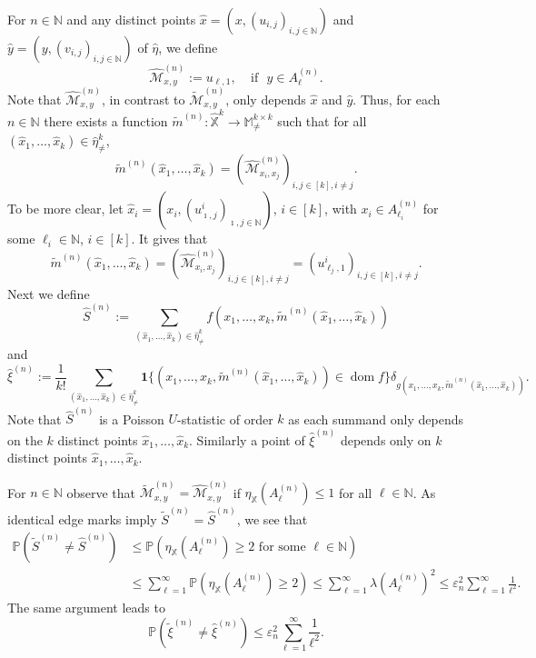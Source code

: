 \documentclass{article}
\theoremstyle{definition}
\numberwithin{equation}{section}
\theoremstyle{remark}
\begin{document}
For $n\in\mathbb{N}$ and any distinct points $\hat{x}=(x,(u_{i,j})_{i,j\in\mathbb{N}})$ and $\hat{y}=(y,(v_{i,j})_{i,j\in\mathbb{N}})$ of $\widehat{\eta}$, we define 
\begin{equation}
	\widehat{\mathcal{M}}^{(n)}_{x,y}:=u_{\ell,1},~~~~~\mbox{if}~~~ y\in A^{(n)}_\ell. 
\end{equation}
Note that $\widehat{\mathcal{M}}^{(n)}_{x,y}$, in contrast to $\widetilde{\mathcal{M}}^{(n)}_{x,y}$, only depends $\hat{x}$ and $\hat{y}$. Thus, for each $n\in\mathbb{N}$ there exists a function $\tilde{m}^{(n)}:\widehat{\mathbb{X}}^k\to\mathbb{M}^{k\times k}_{\neq}$ such that
for all $(\hat{x}_1,\ldots,\hat{x}_k)\in\widehat{\eta}^k_{\neq}$,
$$
\tilde{m}^{(n)}(\hat{x}_1,\ldots,\hat{x}_k)=(\widehat{\mathcal{M}}^{(n)}_{x_i,x_j})_{i,j\in[k],i\neq j}.
$$
To be more clear, let $\hat{x}_i=(x_i,(u^{i}_{\imath,j})_{\imath,j\in\mathbb{N}})$, $i\in[k]$, with $x_i\in A^{(n)}_{\ell_i}$ for some $\ell_i\in\mathbb{N}$, $i\in[k]$. It gives that  
$$
\tilde{m}^{(n)}(\hat{x}_1,\ldots,\hat{x}_k)=(\widehat{\mathcal{M}}^{(n)}_{x_i,x_j})_{i,j\in[k],i\neq j}=(u^{i}_{\ell_j,1})_{i,j\in[k],i\neq j}.
$$
Next we define
\begin{equation}\label{Ustat1}
\widehat{S}^{(n)} := \sum_{(\hat{x}_1,\ldots,\hat{x}_k)\in\widehat{\eta}^k_{\neq}} f(x_1,\ldots,x_k, \tilde{m}^{(n)}(\hat{x}_1,\ldots,\hat{x}_k))
\end{equation}
and
\begin{equation}\label{xi_hat_n}
\widehat{\xi}^{(n)} := \frac{1}{k!} \sum_{(\hat{x}_1,\ldots,\hat{x}_k)\in\widehat{\eta}^k_{\neq}} \mathbf{1}\{ (x_1,\ldots,x_k, \tilde{m}^{(n)}(\hat{x}_1,\ldots,\hat{x}_k))\in\operatorname{dom} f \} \delta_{g(x_1,\ldots,x_k, \tilde{m}^{(n)}(\hat{x}_1,\ldots,\hat{x}_k))}.
\end{equation}
Note that $\widehat{S}^{(n)}$ is a Poisson $U$-statistic of order $k$ as each summand only depends on the $k$ distinct points $\hat{x}_1,\ldots,\hat{x}_k$. Similarly a point of $\widehat{\xi}^{(n)}$ depends only on $k$ distinct points $\hat{x}_1,\ldots,\hat{x}_k$. 

For $n\in\mathbb{N}$ observe that $\widetilde{\mathcal{M}}^{(n)}_{x,y}=\widehat{\mathcal{M}}^{(n)}_{x,y}$ if $\eta_{\mathbb{X}}(A^{(n)}_\ell)\leq 1$ for all $\ell\in\mathbb{N}$. As identical edge marks imply $\widetilde{S}^{(n)}=\widehat{S}^{(n)}$, we see that
\begin{align}
\mathbb{P}(\widetilde{S}^{(n)}\neq\widehat{S}^{(n)}) & \leq \mathbb{P}(\eta_{\mathbb{X}}(A^{(n)}_\ell)\geq 2 \text{ for some } \ell\in\mathbb{N})\nonumber \\
& \leq \sum_{\ell=1}^\infty \mathbb{P}(\eta_{\mathbb{X}}(A^{(n)}_\ell)\geq 2) \leq \sum_{\ell=1}^\infty \lambda(A^{(n)}_\ell)^2 \leq \varepsilon_n^2 \sum_{\ell=1}^\infty \frac{1}{\ell^2}.\label{diff1}
\end{align}
The same argument leads to
\begin{equation}\label{diff2}
\mathbb{P}(\widetilde{\xi}^{(n)}\neq\widehat{\xi}^{(n)}) \leq \varepsilon_n^2 \sum_{\ell=1}^\infty \frac{1}{\ell^2}.
\end{equation}
\end{document}
